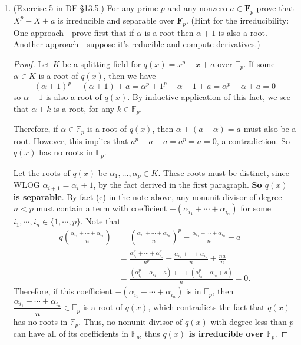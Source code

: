 \documentclass[10pt]{article}
\begin{document}
\begin{enumerate}
\begin{enumerate}
\end{enumerate}

\item (Exercise 5 in DF \S 13.5.) For any prime $p$ and any nonzero $a \in \mathbf{F}_p$ prove that $X^p-X+a$ is irreducible and separable over $\mathbf{F}_p$.  (Hint for the irreducibility: One approach---prove first that if $\alpha$ is a root then $\alpha + 1$ is also a root.  Another approach---suppose it's reducible and compute derivatives.)

\begin{proof}

Let $K$ be a splitting field for $q(x) = x^p - x + a$ over $\mathbb{F}_p$.  If some $\alpha \in K$ is a root of $q(x)$, then we have
$$
(\alpha + 1)^p - (\alpha + 1) + a = \alpha^p + 1^p - \alpha - 1 + a = \alpha^p - \alpha + a = 0
$$
so $\alpha + 1$ is also a root of $q(x)$.  By inductive application of this fact, we see that $\alpha + k$ is a root, for any $k \in \mathbb{F}_p$.

Therefore, if $\alpha \in \mathbb{F}_p$ is a root of $q(x)$, then $\alpha + (a - \alpha) = a$ must also be a root.  However, this implies that $a^p - a + a = a^p = a = 0$, a contradiction.  So $q(x)$ has no roots in $\mathbb{F}_p$.

Let the roots of $q(x)$ be $\alpha_1, \dots , \alpha_p \in K$.  These roots must be distinct, since WLOG $\alpha_{i+1} = \alpha_i + 1$, by the fact derived in the first paragraph.  \textbf{So $q(x)$ is separable}.  By fact (c) in the note above, any nonunit divisor of degree $n < p$ must contain a term with coefficient $-(\alpha_{i_1} + \cdots + \alpha_{i_n})$ for some $i_1, \cdots , i_n \in \{1, \cdots , p \}$.  Note that
\begin{align*}
q\left( \frac{\alpha_{i_1} + \cdots + \alpha_{i_n}}{n} \right) &=
\left( \frac{\alpha_{i_1} + \cdots + \alpha_{i_n}}{n} \right) ^p - \frac{\alpha_{i_1} + \cdots + \alpha_{i_n}}{n} + a
\\
&= \frac{\alpha_{i_1}^p + \cdots + \alpha_{i_n}^p}{n^p} - \frac{\alpha_{i_1} + \cdots + \alpha_{i_n}}{n} + \frac{na}{n}
\\
&= \frac{(\alpha_{i_1}^p - \alpha_{i_1} + a) + \cdots + (\alpha_{i_n}^p - \alpha_{i_n} + a)}{n} = 0.
\end{align*}
Therefore, if this coefficient $-(\alpha_{i_1} + \cdots + \alpha_{i_n})$ is in $\mathbb{F}_p$, then $\dfrac{\alpha_{i_1} + \cdots + \alpha_{i_n}}{n} \in \mathbb{F}_p$ is a root of $q(x)$, which contradicts the fact that $q(x)$ has no roots in $\mathbb{F}_p$.  Thus, no nonunit divisor of $q(x)$ with degree less than $p$ can have all of its coefficients in $\mathbb{F}_p$, thus \textbf{$q(x)$ is irreducible over $\mathbb{F}_p$}.


\end{proof}
\end{enumerate}
\end{document}
